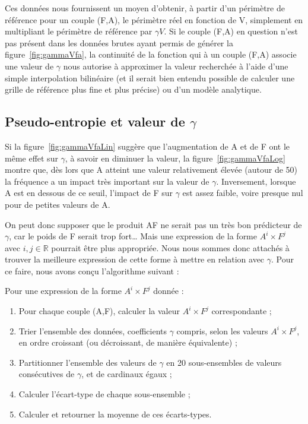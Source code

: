 	Ces données nous fournissent un moyen d'obtenir, à partir d'un périmètre de référence pour un couple (F,A), le périmètre réel en fonction de V, simplement en multipliant le périmètre de référence par $\gamma{}V$. Si le couple (F,A) en question n'est pas présent dans les données brutes ayant permis de générer la figure~\ref{fig:gammaVfa}, la continuité de la fonction qui à un couple (F,A) associe une valeur de $\gamma$ nous autorise à approximer la valeur recherchée à l'aide d'une simple interpolation bilinéaire (et il serait bien entendu possible de calculer une grille de référence plus fine et plus précise) ou d'un modèle analytique.
	
	\subsection{Pseudo-entropie et valeur de \texorpdfstring{$\gamma$}{gamma}}
	Si la figure~\ref{fig:gammaVfaLin} suggère que l'augmentation de A et de F ont le même effet sur $\gamma$, à savoir en diminuer la valeur, la figure~\ref{fig:gammaVfaLog} montre que, dès lors que A atteint une valeur relativement élevée (autour de 50) la fréquence a un impact très important sur la valeur de $\gamma$. Inversement, lorsque A est en dessous de ce seuil, l'impact de F sur $\gamma$ est assez faible, voire presque nul pour de petites valeurs de A.
	
	On peut donc supposer que le produit AF ne serait pas un très bon prédicteur de $\gamma$, car le poids de F serait trop fort\ldots{} Mais une expression de la forme $A^{i}\times{}F^{j}$ avec $i,j \in \mathbb{R}$ pourrait être plus appropriée. Nous nous sommes donc attachés à trouver la meilleure expression de cette forme à mettre en relation avec $\gamma$. Pour ce faire, nous avons conçu l'algorithme suivant :
	
	Pour une expression de la forme $A^{i}\times{}F^{j}$ donnée :	
	
	\begin{enumerate}
		\item Pour chaque couple (A,F), calculer la valeur $A^{i}\times{}F^{j}$ correspondante ;
		\item Trier l'ensemble des données, coefficients $\gamma$ compris, selon les valeurs $A^{i}\times{}F^{j}$, en ordre croissant (ou décroissant, de manière équivalente) ;
		\item Partitionner l'ensemble des valeurs de $\gamma$ en 20 sous-ensembles de valeurs consécutives de $\gamma$, et de cardinaux égaux ;
		\item Calculer l'écart-type de chaque sous-ensemble ;
		\item Calculer et retourner la moyenne de ces écarts-types.
	\end{enumerate}
	
